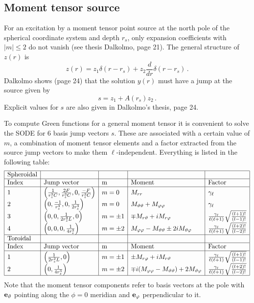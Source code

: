 \documentclass[12pt,a4paper]{article}
\renewcommand{\v}[1]{{\bf #1}}
\begin{document}
\subsection{Moment tensor source}
%
For an excitation by a moment tensor point source at the north pole of the spherical coordinate system and depth $r_s$, only expansion coefficients with $|m| \le 2$ do not vanish (see thesis Dalkolmo, page 21). The general structure of $z(r)$ is
\begin{displaymath}
z(r) = z_1\delta(r-r_s)+z_2\frac{d}{dr}\delta(r-r_s) \,.
\end{displaymath}
Dalkolmo shows (page 24) that the solution $y(r)$ must have a jump at the source given by
\begin{displaymath}
s = z_1+A(r_s)z_2 \,.
\end{displaymath}
Explicit values for $s$ are also given in Dalkolmo's thesis, page 24.

To compute Green functions for a general moment tensor it is convenient to solve the SODE for 6 basis jump vectors $s$. These are associated with a certain value of $m$, a combination of moment tensor elements and a factor extracted from the source jump vectors to make them $\ell$-independent. Everything is listed in the following table:
\begin{displaymath}
\begin{array}{|l|l|l|l|l|}\hline
\mbox{Spheroidal} & & & & \\ \hline
\mbox{Index} & \mbox{Jump vector} & $m$ & \mbox{Moment} & \mbox{Factor} \\ \hline
1 & \left(\frac{1}{r_s^2 C}, \frac{2F}{r_s^3 C}, 0, \frac{-F}{r_s^3 C}\right) & m=0 & M_{rr} & \gamma_\ell \\
2 & \left(0,\frac{-1}{r_s^3},0,\frac{1}{2r_s^3}\right) & m=0 & M_{\vartheta\vartheta}+M_{\varphi\varphi} & \gamma_\ell \\
3 & \left(0,0,\frac{1}{2r_s^2 L}, 0 \right) & m=\pm 1 & \mp M_{r \vartheta}+iM_{r \varphi} & \frac{\gamma_\ell}{\ell(\ell+1)}\sqrt{\frac{(l+1)!}{(l-1)!}} \\
4 & \left(0,0,0,\frac{1}{4r_s^3} \right) & m=\pm 2 & M_{\varphi\varphi}-M_{\vartheta\vartheta}\pm 2iM_{\vartheta\varphi} & \frac{\gamma_\ell}{\ell(\ell+1)}\sqrt{\frac{(l+2)!}{(l-2)!}} \\ \hline
\mbox{Toroidal} & & & & \\ \hline
\mbox{Index} & \mbox{Jump vector} & $m$ & \mbox{Moment} & \mbox{Factor} \\ \hline
1 & \left(\frac{1}{2r_s^2 L}, 0\right) & m=\pm 1 & \pm M_{r \varphi}+iM_{r \vartheta} & \frac{\gamma_\ell}{\ell(\ell+1)}\sqrt{\frac{(l+1)!}{(l-1)!}} \\
2 & \left(0,\frac{1}{4r_s^3}\right) & m=\pm 2 & \mp i(M_{\varphi\varphi}-M_{\vartheta\vartheta})+ 2M_{\vartheta\varphi} & \frac{\gamma_\ell}{\ell(\ell+1)}\sqrt{\frac{(l+2)!}{(l-2)!}}\\ \hline
\end{array}
\end{displaymath}
Note that the moment tensor components refer to basis vectors at the pole with $\v{e}_\vartheta$ pointing along the $\phi=0$ meridian and $\v{e}_\varphi$ perpendicular to it.
\end{document}
